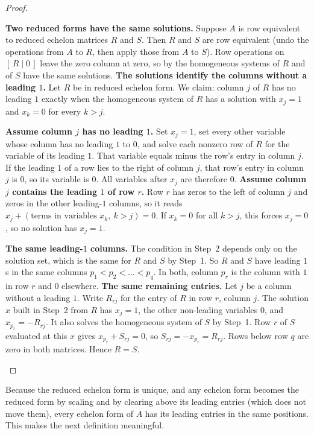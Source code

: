 \documentclass[10pt]{scrartcl}
\begin{document}
\begin{proof}
  \begin{steps}
    \ii \textbf{Two reduced forms have the same solutions.} Suppose $A$ is row equivalent to reduced echelon matrices $R$ and $S$. Then $R$ and $S$ are row equivalent (undo the operations from $A$ to $R$, then apply those from $A$ to $S$). Row operations on $[\,R\mid 0\,]$ leave the zero column at zero, so by  the homogeneous systems of $R$ and of $S$ have the same solutions.
    \ii \textbf{The solutions identify the columns without a leading $1$.} Let $R$ be in reduced echelon form. We claim: column $j$ of $R$ has no leading $1$ exactly when the homogeneous system of $R$ has a solution with $x_j=1$ and $x_k=0$ for every $k>j$.
    \begin{itemize}
      \ii \textbf{Assume column $j$ has no leading $1$.} Set $x_j=1$, set every other variable whose column has no leading $1$ to $0$, and solve each nonzero row of $R$ for the variable of its leading $1$. That variable equals minus the row's entry in column $j$. If the leading $1$ of a row lies to the right of column $j$, that row's entry in column $j$ is $0$, so its variable is $0$. All variables after $x_j$ are therefore $0$.
      \ii \textbf{Assume column $j$ contains the leading $1$ of row $r$.} Row $r$ has zeros to the left of column $j$ and zeros in the other leading-$1$ columns, so it reads $x_j+(\text{terms in variables } x_k,\ k>j)=0$. If $x_k=0$ for all $k>j$, this forces $x_j=0$, so no solution has $x_j=1$.
    \end{itemize}
    \ii \textbf{The same leading-$1$ columns.} The condition in Step~2 depends only on the solution set, which is the same for $R$ and $S$ by Step~1. So $R$ and $S$ have leading $1$s in the same columns $p_1<p_2<\dots<p_q$. In both, column $p_r$ is the column with $1$ in row $r$ and $0$ elsewhere.
    \ii \textbf{The same remaining entries.} Let $j$ be a column without a leading $1$. Write $R_{rj}$ for the entry of $R$ in row $r$, column $j$. The solution $x$ built in Step~2 from $R$ has $x_j=1$, the other non-leading variables $0$, and $x_{p_r}=-R_{rj}$. It also solves the homogeneous system of $S$ by Step~1. Row $r$ of $S$ evaluated at this $x$ gives $x_{p_r}+S_{rj}=0$, so $S_{rj}=-x_{p_r}=R_{rj}$. Rows below row $q$ are zero in both matrices. Hence $R=S$.
  \end{steps}
\end{proof}
Because the reduced echelon form is unique, and any echelon form becomes the reduced form by scaling and by clearing above its leading entries (which does not move them), every echelon form of $A$ has its leading entries in the same positions. This makes the next definition meaningful.
\end{document}
